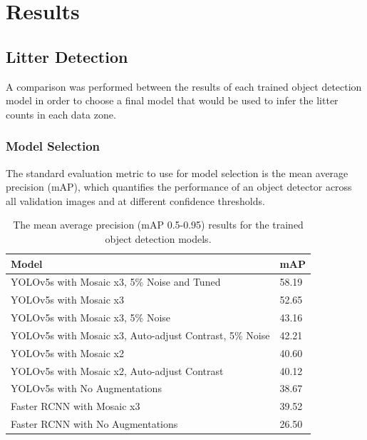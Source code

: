 \documentclass{thesis}
\begin{document}

\chapter{Results} \label{chapter:results}

\section{Litter Detection}

A comparison was performed between the results of each trained object detection model in order to choose a final model that would be used to infer the litter counts in each data zone.

\subsection{Model Selection}

The standard evaluation metric to use for model selection is the mean average precision (mAP), which quantifies the performance of an object detector across all validation images and at different confidence thresholds.

\begin{table}[ht!]
    \centering
    \begin{tabular}{|l| |l|} 
     \hline
     \textbf{Model} & \textbf{mAP} \\
     \hline\hline
     YOLOv5s with Mosaic x3, 5\% Noise and Tuned & 58.19 \\
     YOLOv5s with Mosaic x3 & 52.65 \\
     YOLOv5s with Mosaic x3, 5\% Noise & 43.16 \\
     YOLOv5s with Mosaic x3, Auto-adjust Contrast, 5\% Noise & 42.21 \\
     YOLOv5s with Mosaic x2 & 40.60  \\
     YOLOv5s with Mosaic x2, Auto-adjust Contrast & 40.12  \\
     YOLOv5s with No Augmentations & 38.67 \\
     Faster RCNN with Mosaic x3 & 39.52 \\
     Faster RCNN with No Augmentations & 26.50 \\
     \hline
    \end{tabular}
    \hspace{100mm}
    \caption{The mean average precision (mAP 0.5-0.95) results for the trained object detection models.}
    \label{table:model-mAP}
\end{table}
\end{document}
